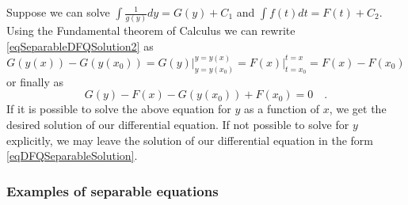 \documentclass[12pt]{book}
\begin{document}
\begin{itemize}
Suppose we can solve $\displaystyle \int \frac{1}{g(y)}dy = G(y)+C_1$ and $\displaystyle \int  f(t)dt=F(t)+C_2$. Using the Fundamental theorem of Calculus we can rewrite \eqref{eqSeparableDFQSolution2} as
\[
G(y(x))-G(y(x_0)) = \left. G(y)\right|_{y=y(x_0)}^{y=y(x)} = \left. F(x) \right|_{t=x_0}^{t=x}= F(x)-F(x_0)
\]
or finally as 
\begin{equation}\label{eqDFQSeparableSolution}
G(y)-F(x)-G(y(x_0))+ F(x_0)=0\quad .
\end{equation}
If it is possible to solve the above equation for $y$ as a function of $x$, we get the desired solution of our differential equation. If not possible to solve for $y$ explicitly, we may leave the solution of our differential equation in the form \eqref{eqDFQSeparableSolution}.
\end{itemize}
\subsubsection{Examples of separable equations}
\end{document}
